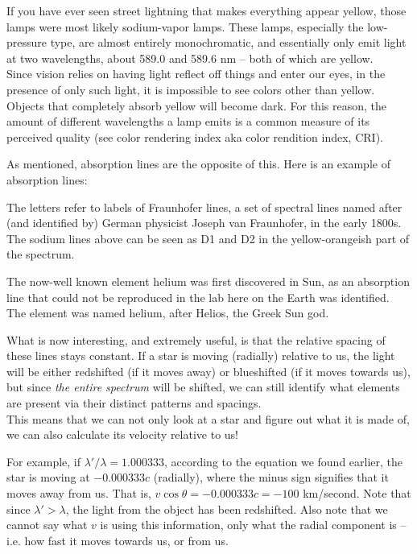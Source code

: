 If you have ever seen street lightning that makes everything appear yellow, those lamps were most likely sodium-vapor lamps. These lamps, especially the low-pressure type, are almost entirely monochromatic, and essentially only emit light at two wavelengths, about 589.0 and 589.6 nm -- both of which are yellow.\\
Since vision relies on having light reflect off things and enter our eyes, in the presence of only such light, it is impossible to see colors other than yellow. Objects that completely absorb yellow will become dark. For this reason, the amount of different wavelengths a lamp emits is a common measure of its perceived quality (see color rendering index aka color rendition index, CRI).

As mentioned, absorption lines are the opposite of this. Here is an example of absorption lines:


The letters refer to labels of Fraunhofer lines, a set of spectral lines named after (and identified by) German physicist Joseph van Fraunhofer, in the early 1800s. The sodium lines above can be seen as D1 and D2 in the yellow-orangeish part of the spectrum.

The now-well known element helium was first discovered in Sun, as an absorption line that could not be reproduced in the lab here on the Earth was identified. The element was named  helium, after Helios, the Greek Sun god.

What is now interesting, and extremely useful, is that the relative spacing of these lines stays constant. If a star is moving (radially) relative to us, the light will be either redshifted (if it moves away) or blueshifted (if it moves towards us), but since \emph{the entire spectrum} will be shifted, we can still identify what elements are present via their distinct patterns and spacings.\\
This means that we can not only look at a star and figure out what it is made of, we can also calculate its velocity relative to us!

For example, if $\lambda'/\lambda = 1.000333$, according to the equation we found earlier, the star is moving at $-0.000333 c$ (radially), where the minus sign signifies that it moves away from us. That is, $v \cos \theta = -0.000333c = -100$ km/second. Note that since $\lambda' > \lambda$, the light from the object has been redshifted. Also note that we cannot say what $v$ is using this information, only what the radial component is -- i.e. how fast it moves towards us, or from us.

